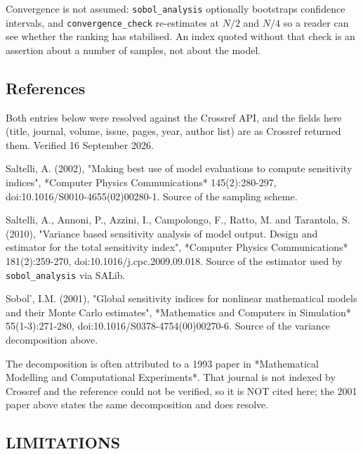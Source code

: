 \documentclass[10pt,a4paper,twoside]{report}
\begin{document}
Convergence is not assumed: \texttt{sobol\_analysis} optionally bootstraps confidence intervals, and \texttt{convergence\_check} re-estimates at $N/2$ and $N/4$ so a reader can see whether the ranking has stabilised. An index quoted without that check is an assertion about a number of samples, not about the model.

\subsection*{References}

Both entries below were resolved against the Crossref API, and the fields here (title, journal, volume, issue, pages, year, author list) are as Crossref returned them. Verified 16 September 2026.

Saltelli, A. (2002), "Making best use of model evaluations to compute sensitivity indices", *Computer Physics Communications* 145(2):280-297, doi:10.1016/S0010-4655(02)00280-1. Source of the sampling scheme.

Saltelli, A., Annoni, P., Azzini, I., Campolongo, F., Ratto, M. and Tarantola, S. (2010), "Variance based sensitivity analysis of model output. Design and estimator for the total sensitivity index", *Computer Physics Communications* 181(2):259-270, doi:10.1016/j.cpc.2009.09.018. Source of the estimator used by \texttt{sobol\_analysis} via SALib.

Sobol', I.M. (2001), "Global sensitivity indices for nonlinear mathematical models and their Monte Carlo estimates", *Mathematics and Computers in Simulation* 55(1-3):271-280, doi:10.1016/S0378-4754(00)00270-6. Source of the variance decomposition above.

The decomposition is often attributed to a 1993 paper in *Mathematical Modelling and Computational Experiments*. That journal is not indexed by Crossref and the reference could not be verified, so it is NOT cited here; the 2001 paper above states the same decomposition and does resolve.

\subsection*{LIMITATIONS}
\end{document}

